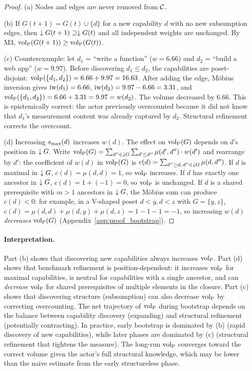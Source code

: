 \begin{proof}
(a) Nodes and edges are never removed from $\mathcal{C}$.

(b) If $G(t+1) = G(t) \cup \{d\}$ for a new capability $d$ with no new
subsumption edges, then $\downarrow G(t+1) \supseteq \downarrow G(t)$ and all independent
weights are unchanged. By M3, ${\operatorname{vol}_{\mathrm{P}}}(G(t+1)) \geq {\operatorname{vol}_{\mathrm{P}}}(G(t))$.

(c) Counterexample: let $d_1$ = ``write a function'' ($w = 6.66$) and $d_2$ =
``build a web app'' ($w = 9.97$). Before discovering $d_1 \leq d_2$, the
capabilities are poset-disjoint: ${\operatorname{vol}_{\mathrm{P}}}(\{d_1, d_2\}) = 6.66 + 9.97 =
16.63$. After adding the edge, M\"{o}bius inversion gives $\operatorname{iw}(d_1) = 6.66$,
$\operatorname{iw}(d_2) = 9.97 - 6.66 = 3.31$, and ${\operatorname{vol}_{\mathrm{P}}}(\{d_1, d_2\}) = 6.66 + 3.31 =
9.97 = w(d_2)$. The volume decreased by $6.66$. This is epistemically correct:
the actor previously overcounted because it did not know that $d_1$'s
measurement content was already captured by $d_2$. Structural refinement
corrects the overcount.

(d) Increasing $s_{\mathrm{max}}(d)$ increases $w(d)$. The effect on ${\operatorname{vol}_{\mathrm{P}}}(G)$ depends on
$d$'s position in $\downarrow G$. Write ${\operatorname{vol}_{\mathrm{P}}}(G) = \sum_{d'' \in \downarrow G} \sum_{d'
\leq d''} \mu(d', d'') \cdot w(d')$ and rearrange by $d'$: the coefficient of
$w(d)$ in ${\operatorname{vol}_{\mathrm{P}}}(G)$ is $c(d) = \sum_{d'' \geq d,\, d'' \in \downarrow G} \mu(d,
d'')$. If $d$ is maximal in $\downarrow G$, $c(d) = \mu(d, d) = 1$, so ${\operatorname{vol}_{\mathrm{P}}}$
increases. If $d$ has exactly one ancestor in $\downarrow G$, $c(d) = 1 + (-1) = 0$,
so ${\operatorname{vol}_{\mathrm{P}}}$ is unchanged. If $d$ is a shared prerequisite with $m > 1$ ancestors
in $\downarrow G$, the M\"{o}bius sum can produce $c(d) < 0$: for example, in a
V-shaped poset $d < y, d < z$ with $G = \{y, z\}$, $c(d) = \mu(d, d) +
\mu(d, y) + \mu(d, z) = 1 - 1 - 1 = -1$, so increasing $w(d)$
\emph{decreases} ${\operatorname{vol}_{\mathrm{P}}}(G)$ (Appendix~\ref{app:proof_bootstrap}).
\end{proof}

\paragraph{Interpretation.} Part (b) shows that discovering new capabilities
always increases ${\operatorname{vol}_{\mathrm{P}}}$. Part (d) shows that benchmark refinement is
position-dependent: it increases ${\operatorname{vol}_{\mathrm{P}}}$ for maximal capabilities, is neutral
for capabilities with a single ancestor, and can \emph{decrease} ${\operatorname{vol}_{\mathrm{P}}}$ for
shared prerequisites of multiple elements in the closure. Part (c) shows that
discovering structure (subsumption) can also decrease ${\operatorname{vol}_{\mathrm{P}}}$ by correcting
overcounting. The net trajectory of ${\operatorname{vol}_{\mathrm{P}}}$ during bootstrap depends on the
balance between capability discovery (expanding) and structural refinement
(potentially contracting). In practice, early bootstrap is dominated by (b)
(rapid discovery of new capabilities), while later phases are dominated by (c)
(structural refinement that tightens the measure). The long-run ${\operatorname{vol}_{\mathrm{P}}}$
converges toward the correct volume given the actor's full structural
knowledge, which may be lower than the naive estimate from the early
structureless phase.

